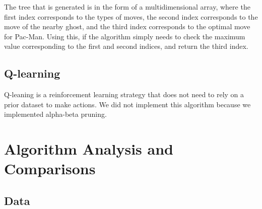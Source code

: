 \documentclass[a4paper,oneside,10pt]{report}
\begin{document}
The tree that is generated is in the form of a multidimensional array, where the first index corresponds to the types of moves, the second index corresponds to the move of the nearby ghost, and the third index corresponds to the optimal move for Pac-Man. Using this, if the algorithm simply needs to check the maximum value corresponding to the first and second indices, and return the third index.

\section{Q-learning}\label{qlearn}
Q-leaning is a reinforcement learning strategy that does not need to rely on a prior dataset to make actions. We did not implement this algorithm because we implemented alpha-beta pruning.

\chapter{Algorithm Analysis and Comparisons} \label{comparison}

\section {Data} \label{compData}
\end{document}
